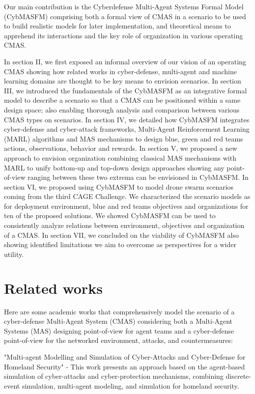 \documentclass[conference]{IEEEtran}
\begin{document}
Our main contribution is the Cyberdefense Multi-Agent Systems Formal Model (CybMASFM) comprising both a formal view of CMAS in a scenario to be used to build realistic models for later implementation, and theoretical means to apprehend its interactions and the key role of organization in various operating CMAS.

In section II, we first exposed an informal overview of our vision of an operating CMAS showing how related works in cyber-defense, multi-agent and machine learning domains are thought to be key means to envision scenarios.
In section III, we introduced the fundamentals of the CybMASFM as an integrative formal model to describe a scenario so that a CMAS can be positioned within a same design space; also enabling thorough analysis and comparison between various CMAS types on scenarios.
In section IV, we detailed how CybMASFM integrates cyber-defense and cyber-attack frameworks, Multi-Agent Reinforcement Learning (MARL) algorithms and MAS mechanisms to design blue, green and red teams actions, observations, behavior and rewards.
In section V, we proposed a new approach to envision organization combining classical MAS mechanisms with MARL to unify bottom-up and top-down design approaches showing any point-of-view ranging between these two extrema can be envisioned in CybMASFM.
In section VI, we proposed using CybMASFM to model drone swarm scenarios coming from the third CAGE Challenge\cite{cage_challenge_3_announcement}. We characterized the scenario models as for deployment environment, blue and red teams objectives and organizations for ten of the proposed solutions. We showed CybMASFM can be used to consistently analyze relations between environment, objectives and organization of a CMAS.
In section VII, we concluded on the viability of CybMASFM also showing identified limitations we aim to overcome as perspectives for a wider utility.

\section{Related works}



Here are some academic works that comprehensively model the scenario of a cyber-defense Multi-Agent System (CMAS) considering both a Multi-Agent Systems (MAS) designing point-of-view for agent teams and a cyber-defense point-of-view for the networked environment, attacks, and countermeasures:

"Multi-agent Modelling and Simulation of Cyber-Attacks and Cyber-Defense for Homeland Security" - This work presents an approach based on the agent-based simulation of cyber-attacks and cyber-protection mechanisms, combining discrete-event simulation, multi-agent modeling, and simulation for homeland security\cite{kotenko2007}.
\end{document}
